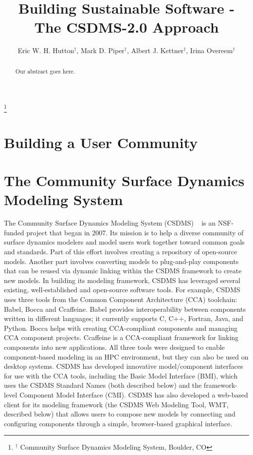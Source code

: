 \documentclass[11pt, oneside]{amsart}
\begin{document}
\title[]{Building Sustainable Software - The CSDMS-2.0 Approach}

\author{
  Eric W. H. Hutton$^{\dag}$,
  Mark D. Piper$^{\dag}$,
  Albert J. Kettner$^{\dag}$,
  Irina Overeem$^{\dag}$}

\thanks{{}$^{\dag}$ Community Surface Dynamics Modeling System, Boulder, CO}

\begin{abstract}

Our abstract goes here.

\end{abstract}

\maketitle

\section{Building a User Community}


\section{The Community Surface Dynamics Modeling System}

The Community Surface Dynamics Modeling System (CSDMS)
~\cite{peckham2012component}
is an NSF-funded project that began in 2007. Its mission is to help a diverse
community of surface dynamics modelers and model users work together toward
common goals and standards. Part of this effort involves creating a repository
of open-source models. Another part involves converting models to plug-and-play
components that can be reused via dynamic linking within the CSDMS framework to
create new models. In building its modeling framework, CSDMS has leveraged
several existing, well-established and open-source software tools. For example,
CSDMS uses three tools from the Common Component Architecture (CCA) toolchain:
Babel, Bocca and Ccaffeine. Babel provides interoperability between components
written in different languages; it currently supports C, C++, Fortran, Java,
and Python. Bocca helps with creating CCA-compliant components and managing CCA
component projects. Ccaffeine is a CCA-compliant framework for linking
components into new applications. All three tools were designed to enable
component-based modeling in an HPC environment, but they can also be used on
desktop systems. CSDMS has developed innovative model/component interfaces for
use with the CCA tools, including the Basic Model Interface (BMI), which uses
the CSDMS Standard Names (both described below) and the framework-level
Component Model Interface (CMI). CSDMS has also developed a web-based client
for its modeling framework (the CSDMS Web Modeling Tool, WMT, described below)
that allows users to compose new models by connecting and configuring
components through a simple, browser-based graphical interface.
\end{document}
